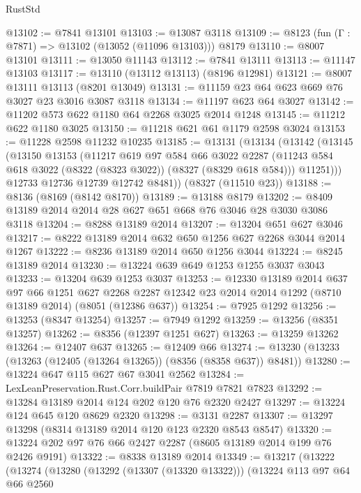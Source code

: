 \begin{lexlean}{RustStd}
\begin{coremodule}
{\begin{coremodule}
{{{{{{{{{{{{{{{{{{{{{{{{{{{{{{{{{{{{{{{{{{{{{{{{{{{{{{@13102 := @7841 @13101
@13103 := @13087 @3118
@13109 := @8123 (fun (Γ : @7871) => @13102 (@13052 (@11096 @13103))) @8179
@13110 := @8007 @13101
@13111 := @13050 @11143
@13112 := @7841 @13111
@13113 := @11147 @13103
@13117 := @13110 (@13112 @13113) (@8196 @12981)
@13121 := @8007 @13111 @13113 (@8201 @13049)
@13131 := @11159 @23 @64 @623 @669 @76 @3027 @23 @3016 @3087 @3118
@13134 := @11197 @623 @64 @3027
@13142 := @11202 @573 @622 @1180 @64 @2268 @3025 @2014 @1248
@13145 := @11212 @622 @1180 @3025
@13150 := @11218 @621 @61 @1179 @2598 @3024
@13153 := @11228 @2598 @11232 @10235
@13185 := @13131
    (@13134
      (@13142
        (@13145
          (@13150
            @13153
            (@11217
              @619
              @97
              @584
              @66
              @3022
              @2287
              (@11243 @584 @618 @3022 (@8322 (@8323 @3022)) (@8327 (@8329 @618 @584)))
              @11251)))
        @12733
        @12736
        @12739
        @12742
        @8481))
    (@8327 (@11510 @23))
@13188 := @8136 (@8169 (@8142 @8170))
@13189 := @13188 @8179
@13202 := @8409 @13189 @2014 @2014 @28 @627 @651 @668 @76 @3046 @28 @3030 @3086 @3118
@13204 := @8288 @13189 @2014
@13207 := @13204 @651 @627 @3046
@13217 := @8222 @13189 @2014 @632 @650 @1256 @627 @2268 @3044 @2014 @1267
@13222 := @8236 @13189 @2014 @650 @1256 @3044
@13224 := @8245 @13189 @2014
@13230 := @13224 @639 @649 @1253 @1255 @3037 @3043
@13233 := @13204 @639 @1253 @3037
@13253 := @12330
    @13189
    @2014
    @637
    @97
    @66
    @1251
    @627
    @2268
    @2287
    @12342
    @23
    @2014
    @2014
    @1292
    (@8710 @13189 @2014)
    (@8051 (@12386 @637))
@13254 := @7925 @1292
@13256 := @13253 (@8347 @13254)
@13257 := @7949 @1292
@13259 := @13256 (@8351 @13257)
@13262 := @8356 (@12397 @1251 @627)
@13263 := @13259 @13262
@13264 := @12407 @637
@13265 := @12409 @66
@13274 := @13230 (@13233 (@13263 (@12405 (@13264 @13265)) (@8356 (@8358 @637)) @8481))
@13280 := @13224 @647 @115 @627 @67 @3041 @2562
@13284 := LexLeanPreservation.Rust.Corr.buildPair @7819 @7821 @7823
@13292 := @13284 @13189 @2014 @124 @202 @120 @76 @2320 @2427
@13297 := @13224 @124 @645 @120 @8629 @2320
@13298 := @3131 @2287
@13307 := @13297 @13298 (@8314 @13189 @2014 @120 @123 @2320 @8543 @8547)
@13320 := @13224 @202 @97 @76 @66 @2427 @2287 (@8605 @13189 @2014 @199 @76 @2426 @9191)
@13322 := @8338 @13189 @2014
@13349 := @13217
    (@13222
      (@13274
        (@13280
          (@13292 (@13307 (@13320 @13322)))
          (@13224
            @113
            @97
            @64
            @66
            @2560
}}}}}}}}}}}}}}}}}}}}}}}}}}}}}}}}}}}}}}}}}}}}}}}}}}}}}}
\end{coremodule}}
\end{coremodule}
\end{lexlean}
